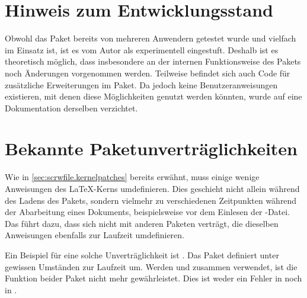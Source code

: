 \EndIndexGroup%
\ExampleEndFix


\section{Hinweis zum Entwicklungsstand}

Obwohl das Paket bereits von mehreren Anwendern getestet wurde und vielfach im
Einsatz ist, ist es vom Autor als experimentell eingestuft. Deshalb ist es
theoretisch möglich, dass insbesondere an der internen Funktionsweise des
Pakets noch Änderungen vorgenommen werden. Teilweise befindet sich auch Code
für zusätzliche Erweiterungen im Paket. Da jedoch keine Benutzeranweisungen
existieren, mit denen diese Möglichkeiten genutzt werden könnten, wurde auf
eine Dokumentation derselben verzichtet.


\section{Bekannte Paketunverträglichkeiten}

Wie in \autoref{sec:scrwfile.kernelpatches} bereits erwähnt, muss
 einige wenige Anweisungen des \LaTeX-Kerns
umdefinieren. Dies geschieht nicht allein während des Ladens des Pakets,
sondern vielmehr zu verschiedenen Zeitpunkten während der Abarbeitung eines
Dokuments, beispielsweise vor dem Einlesen der
-Datei. Das führt dazu, dass 
sich nicht mit anderen Paketen verträgt, die dieselben Anweisungen ebenfalls
zur Laufzeit umdefinieren.

Ein Beispiel für eine solche Unverträglichkeit ist
. Das
Paket definiert unter gewissen Umständen  zur Laufzeit
um. Werden  und  zusammen verwendet, ist
die Funktion beider Paket nicht mehr gewährleistet. Dies ist weder ein Fehler
in  noch in .%
%
\EndIndexGroup



